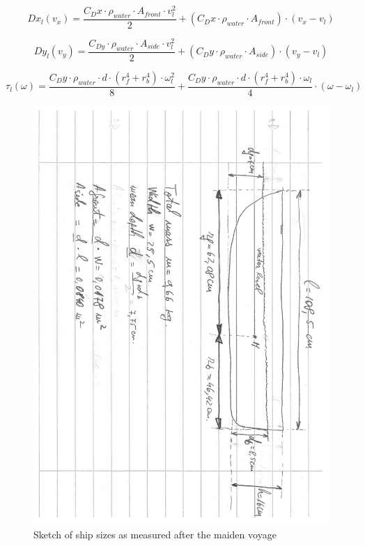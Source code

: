\[ Dx_{l}(v_{x}) = \frac{C_{D}x\cdot\rho_{water}\cdot A_{front}\cdot v_{l}^{2}}{2} + (C_{D}x\cdot\rho_{water}\cdot A_{front})\cdot (v_{x}-v_{l}) \]

\[ Dy_{l}(v_{y}) = \frac{C_{Dy}\cdot\rho_{water}\cdot A_{side}\cdot v_{l}^{2}}{2} + (C_{D}y\cdot\rho_{water}\cdot A_{side})\cdot (v_{y}-v_{l}) \]

\[ \tau_{l}(\omega) = \frac{C_{D}y \cdot \rho_{water} \cdot d \cdot (r_{f}^{4} + r_{b}^{4}) \cdot \omega_{l}^{2}}{8} + \frac{C_{D}y \cdot \rho_{water} \cdot d \cdot (r_{f}^{4} + r_{b}^{4}) \cdot \omega_{l}}{4} \cdot (\omega - \omega_{l}) \] 

\begin{figure}[htbp]
	\centering
	\includegraphics[width=\textwidth, trim=1.8cm 0cm 0cm 2cm, clip = true, angle = 90, width=\textwidth]{img/ship_sizes}
	\caption{Sketch of ship sizes as measured after the maiden voyage}
	\label{fig:ship_sizes}
\end{figure}


